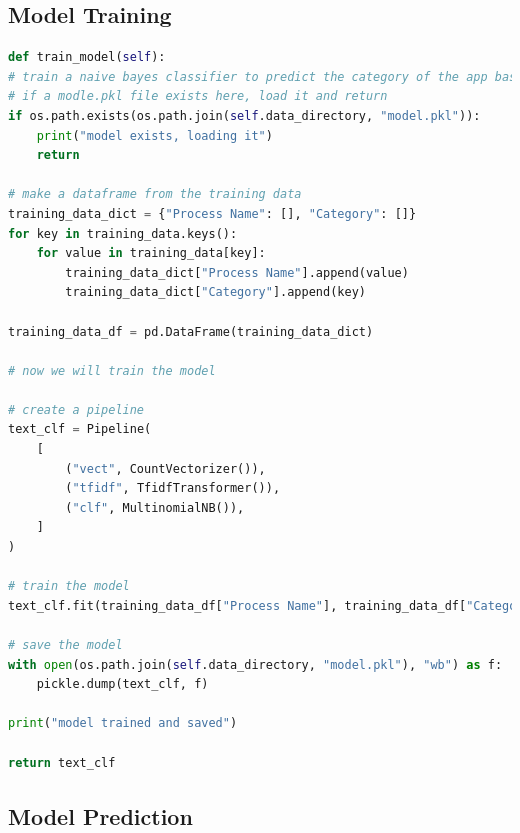 \documentclass[openany]{report}
\begin{document}
\subsection{Model Training}

\begin{lstlisting}[language=Python, caption=Model Training]
def train_model(self):
# train a naive bayes classifier to predict the category of the app based on the process name
# if a modle.pkl file exists here, load it and return
if os.path.exists(os.path.join(self.data_directory, "model.pkl")):
    print("model exists, loading it")
    return

# make a dataframe from the training data
training_data_dict = {"Process Name": [], "Category": []}
for key in training_data.keys():
    for value in training_data[key]:
        training_data_dict["Process Name"].append(value)
        training_data_dict["Category"].append(key)

training_data_df = pd.DataFrame(training_data_dict)

# now we will train the model

# create a pipeline
text_clf = Pipeline(
    [
        ("vect", CountVectorizer()),
        ("tfidf", TfidfTransformer()),
        ("clf", MultinomialNB()),
    ]
)

# train the model
text_clf.fit(training_data_df["Process Name"], training_data_df["Category"])

# save the model
with open(os.path.join(self.data_directory, "model.pkl"), "wb") as f:
    pickle.dump(text_clf, f)

print("model trained and saved")

return text_clf
\end{lstlisting}

\subsection{Model Prediction}
\end{document}

